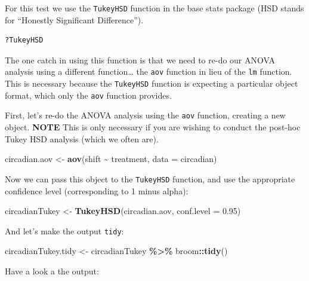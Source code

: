 \documentclass[
]{book}
\newenvironment{Shaded}{\begin{snugshade}}{\end{snugshade}}
\newcommand{\AttributeTok}[1]{\textcolor[rgb]{0.13,0.29,0.53}{#1}}
\newcommand{\FloatTok}[1]{\textcolor[rgb]{0.00,0.00,0.81}{#1}}
\newcommand{\FunctionTok}[1]{\textcolor[rgb]{0.13,0.29,0.53}{\textbf{#1}}}
\newcommand{\NormalTok}[1]{#1}
\newcommand{\OtherTok}[1]{\textcolor[rgb]{0.56,0.35,0.01}{#1}}
\newcommand{\SpecialCharTok}[1]{\textcolor[rgb]{0.81,0.36,0.00}{\textbf{#1}}}
\begin{document}
For this test we use the \texttt{TukeyHSD} function in the base stats package (HSD stands for ``Honestly Significant Difference'').

\begin{verbatim}
?TukeyHSD
\end{verbatim}

The one catch in using this function is that we need to re-do our ANOVA analysis using a different function\ldots{} the \texttt{aov} function in lieu of the \texttt{lm} function. This is necessary because the \texttt{TukeyHSD} function is expecting a particular object format, which only the \texttt{aov} function provides.

First, let's re-do the ANOVA analysis using the \texttt{aov} function, creating a new object. \textbf{NOTE} This is only necessary if you are wishing to conduct the post-hoc Tukey HSD analysis (which we often are).

\begin{Shaded}
\begin{Highlighting}[]
\NormalTok{circadian.aov }\OtherTok{\textless{}{-}} \FunctionTok{aov}\NormalTok{(shift }\SpecialCharTok{\textasciitilde{}}\NormalTok{ treatment, }\AttributeTok{data =}\NormalTok{ circadian)}
\end{Highlighting}
\end{Shaded}

Now we can pass this object to the \texttt{TukeyHSD} function, and use the appropriate confidence level (corresponding to 1 minus alpha):

\begin{Shaded}
\begin{Highlighting}[]
\NormalTok{circadianTukey }\OtherTok{\textless{}{-}} \FunctionTok{TukeyHSD}\NormalTok{(circadian.aov, }\AttributeTok{conf.level =} \FloatTok{0.95}\NormalTok{)}
\end{Highlighting}
\end{Shaded}

And let's make the output \texttt{tidy}:

\begin{Shaded}
\begin{Highlighting}[]
\NormalTok{circadianTukey.tidy }\OtherTok{\textless{}{-}}\NormalTok{ circadianTukey }\SpecialCharTok{\%\textgreater{}\%}
\NormalTok{  broom}\SpecialCharTok{::}\FunctionTok{tidy}\NormalTok{()}
\end{Highlighting}
\end{Shaded}

Have a look a the output:
\end{document}
